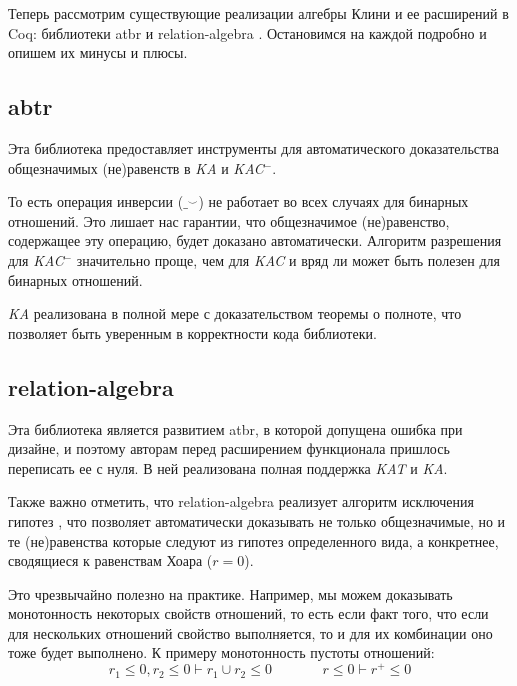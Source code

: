 \documentclass[times
              ,specification
              ,annotation
              ]{itmo-student-thesis}
\begin{document}
    Теперь рассмотрим существующие реализации алгебры Клини и ее расширений в Coq: библиотеки
    atbr \cite{atbr} и relation-algebra \cite{kat}.
    Остановимся на каждой подробно и опишем их минусы и плюсы.

    \subsection{abtr}

      Эта библиотека предоставляет инструменты для автоматического доказательства общезначимых
      (не)равенств в \textit{KA} и \textit{KAC}$^-$.

      То есть операция инверсии ($\_^\smile$) не работает во всех случаях для бинарных отношений. Это лишает
      нас гарантии, что общезначимое (не)равенство, содержащее эту операцию, будет доказано
      автоматически. Алгоритм разрешения для \textit{KAC}$^-$ значительно проще, чем для \textit{KAC} и
      вряд ли может быть полезен для бинарных отношений.
      
      \textit{KA} реализована в полной мере с доказательством теоремы о полноте, что позволяет быть
      уверенным в корректности кода библиотеки.

    \subsection{relation-algebra}

      Эта библиотека является развитием atbr, в которой допущена ошибка при дизайне, и поэтому
      авторам перед расширением функционала пришлось переписать ее с нуля. В ней реализована полная
      поддержка \textit{KAT} и \textit{KA}.

      Также важно отметить, что relation-algebra реализует алгоритм исключения гипотез
      \cite{hkat, hkat_cpc}, что позволяет автоматически доказывать
      не только общезначимые, но и те (не)равенства которые следуют из гипотез определенного вида, а
      конкретнее, сводящиеся к равенствам Хоара ($ r = 0 $).

      Это чрезвычайно полезно на практике.
      Например, мы можем доказывать монотонность некоторых свойств отношений,
      то есть если факт того, что если для нескольких отношений свойство выполняется, то и для их
      комбинации оно тоже будет выполнено.
      К примеру монотонность пустоты отношений:
      $$ r_1 \leq 0, r_2 \leq 0 \vdash r_1 \cup r_2 \leq 0 \;\;\;\;\;\;\;\;\;\;\;\;\; r \leq 0 \vdash r^+ \leq 0 $$
\end{document}
